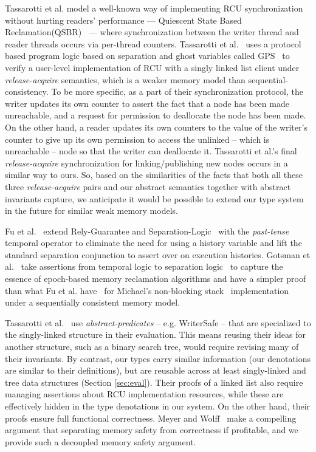 Tassarotti et al. model a well-known way of implementing RCU synchronization without hurting readers' performance --- \textsf{Quiescent State Based Reclamation}(QSBR)~\cite{urcu_ieee} --- where synchronization between the writer thread and reader threads occurs via per-thread counters. Tassarotti et al.~\cite{verrcu} uses a protocol based program logic based on separation and ghost variables called \textsf{GPS}~\cite{Turon:2014:GNW:2660193.2660243} to verify a user-level implementation of \textsf{RCU} with a singly linked list client under \emph{release-acquire} semantics, which is a weaker memory model than sequential-consistency. To be more specific, as a part of their synchronization protocol, the writer updates its own counter to assert the fact that a node has been made unreachable, and a request for permission to deallocate the node has been made. On the other hand, a reader updates its own counters to the value of the writer's counter to give up its own permission to access the unlinked -- which is unreachable -- node so that the writer can deallocate it. Tassarotti et al.'s final \emph{release-acquire} synchronization for linking/publishing new nodes occurs in a similar way to ours. So, based on the similarities of the facts that both all these three \emph{release-acquire} pairs and our abstract semantics together with abstract invariants capture, we anticipate it would be possible to extend our type system in the future for similar weak memory models.

 Fu et al.~\cite{shao_temp} extend Rely-Guarantee and Separation-Logic~\cite{vafeiadis07,Feng:2007:RCS:1762174.1762193,Feng:2009:LRR:1480881.1480922} with the \textit{past-tense} temporal operator to eliminate the need for using a history variable and lift the standard separation conjunction to assert over on execution histories. Gotsman et al.~\cite{Gotsman:2013:VCM:2450268.2450289} take assertions from temporal logic to separation logic~\cite{vafeiadis07} to capture the essence of epoch-based memory reclamation algorithms and have a simpler proof than what Fu et al. have~\cite{shao_temp} for Michael's non-blocking stack~\cite{Michael:2004:HPS:987524.987595} implementation under a sequentially consistent memory model.

Tassarotti et al.~\cite{verrcu} use \textit{abstract-predicates} -- e.g. WriterSafe -- that are specialized to the singly-linked structure in their evaluation.  This means reusing their ideas for another structure, such as a binary search tree, would require revising many of their invariants.  By contrast, our types carry similar information (our denotations are similar to their definitions), but are reusable across at least singly-linked and tree data structures (Section \ref{sec:eval}). 
Their proofs of a linked list also require managing assertions about RCU implementation resources, while these are effectively hidden in the type denotations in our system.
On the other hand, their proofs ensure full functional correctness.  Meyer and Wolff~\cite{myr} make a compelling argument that separating memory safety from correctness if profitable, and we provide such a decoupled memory safety argument. 
